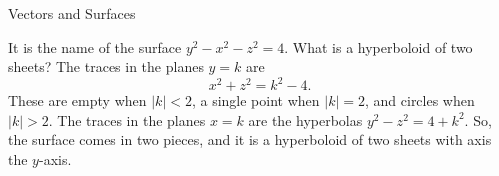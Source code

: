 \documentclass{article}
\begin{document}
\begin{category}{Vectors and Surfaces}
  \begin{clue}[say]
    It is the name of the surface $y^2-x^2-z^2=4$.
  \response
    What is a hyperboloid of two sheets?
  \solution
    The traces in the planes $y=k$ are
    \[
    x^2+z^2=k^2-4.
    \]
    These are empty when $|k|<2$, a single point when $|k|=2$, and circles when $|k|>2$. The traces in the planes $x=k$ are the hyperbolas $y^2-z^2=4+k^2$. So, the surface comes in two pieces, and it is a hyperboloid of two sheets with axis the $y$-axis.
  \end{clue}

\end{category}

\end{document}
